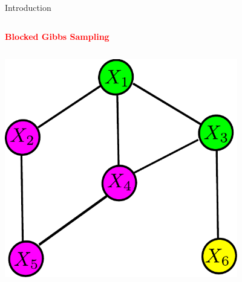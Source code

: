 \documentclass[serif,mathserif,final]{beamer}
\newcommand{\itemlinespace}{0.22in}
\newcommand{\paralinespace}{0.5in}
\newcommand{\insertlinespace}{\vspace{\itemlinespace}}
\newcommand{\insertparaspace}{\vspace{\paralinespace}}
\newcommand{\semititle}[1]{\textcolor{red}{\Huge \textbf{#1}}}
\begin{document}
\begin{frame}{}
\begin{columns}[t]
\begin{column}{0.49\linewidth}
\begin{block}{\Huge Introduction}
{\begin{columns}
          \end{columns}
        

        \insertparaspace
        \semititle{Blocked Gibbs Sampling} \\
        \vspace{\itemlinespace}
        \begin{columns}

        \begin{column}{5in}
          \includegraphics[width=4in]{figs/blocked_gibbs}
        \end{column}


\end{columns}}
\end{block}
\end{column}
\end{columns}
\end{frame}
\end{document}
